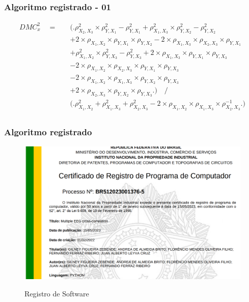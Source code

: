 \documentclass[11pt, aspectratio=169]{beamer}
\begin{document}
  \begin{frame}
  \frametitle{Algoritmo registrado - 01}

  \begin{equation}
    \begin{split}
      DMC_{x}^{2} \quad = \quad & \Big( \Big. \rho^{2}_{X_{2},X_{3}} \times \rho^{2}_{Y,X_{1}}- \rho^{2}_{Y,X_{1}} + \rho^{2}_{X_{1},X_{3}}\times \rho^{2}_{Y,X_{2}}-\rho^{2}_{Y,X_{2}} \\
      &+ 2 \times \rho_{X_{1},X_{2}} \times \rho_{Y,X_{1}} \times \rho_{Y,X_{2}}   - 2 \times \rho_{X_{1},X_{3}} \times \rho_{X_{2},X_{3}} \times \rho_{Y,X_{1}} \\
      &+ \rho^{2}_{X_{1},X_{2}} \times \rho^{2}_{Y,X_{3}}-\rho^{2}_{Y,X_{3}} + 2 \times \rho_{X_{1},X_{3}} \times \rho_{Y,X_{1}} \times \rho_{Y,X_{3}} \\
      &- 2 \times \rho_{X_{1},X_{2}} \times \rho_{X_{2},X_{3}} \times \rho_{Y,X_{1}} \times \rho_{Y,X_{3}} \\
      &- 2 \times \rho_{X_{1},X_{2}} \times \rho_{X_{1},X_{3}} \times \rho_{Y,X_{2}} \times \rho_{Y,X_{3}} \\
      &+ 2 \times \rho_{X_{2},X_{3}} \times \rho_{Y,X_{2}} \times \rho_{Y,X_{3}} \Big. \Big)    \quad \Big/ \\
      & \Big( \Big. \rho^{2}_{X_{1},X_{2}} + \rho^{2}_{X_{1},X_{3}} + \rho^{2}_{X_{2},X_{3}} - 2 \times \rho_{X_{1},X_{2}} \times \rho_{X_{1},X_{3}} \times \rho_{X_{2},X_{3}}^{-1}\Big. \Big)  \\
    \end{split}
    \label{eq:dmc_3x_y}
  \end{equation}

\end{frame}

\begin{frame}
  \frametitle{Algoritmo registrado}

  \begin{figure}[!htb]
    \centering
    \caption{Registro de Software}
    \includegraphics[height=.6\paperheight]{../Figures/artigos_publicados/certificado_alg_01.png}
    \label{fig:alg_pub_01}
  \end{figure}

\end{frame}
\end{document}
